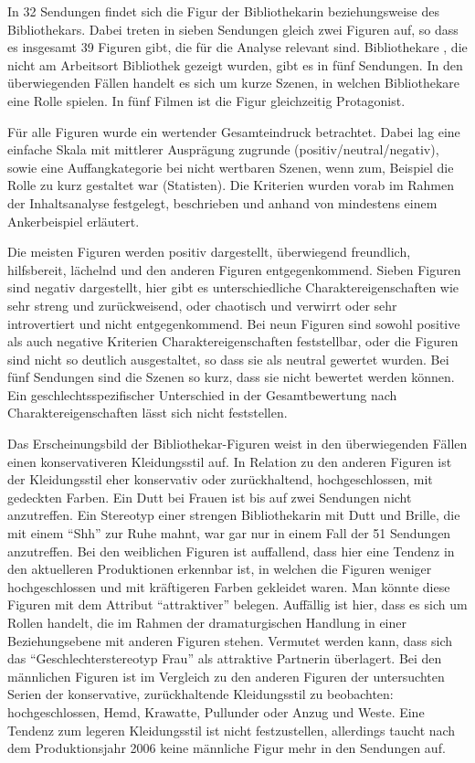 In 32 Sendungen findet sich die Figur der Bibliothekarin beziehungsweise
des Bibliothekars. Dabei treten in sieben Sendungen gleich zwei Figuren
auf, so dass es insgesamt 39 Figuren gibt, die für die Analyse relevant
sind. Bibliothekare , die nicht am Arbeitsort Bibliothek gezeigt wurden,
gibt es in fünf Sendungen. In den überwiegenden Fällen handelt es sich
um kurze Szenen, in welchen Bibliothekare eine Rolle spielen. In fünf
Filmen ist die Figur gleichzeitig Protagonist.

Für alle Figuren wurde ein wertender Gesamteindruck betrachtet. Dabei
lag eine einfache Skala mit mittlerer Ausprägung zugrunde
(positiv/neutral/negativ), sowie eine Auffangkategorie bei nicht
wertbaren Szenen, wenn zum, Beispiel die Rolle zu kurz gestaltet war
(Statisten). Die Kriterien wurden vorab im Rahmen der Inhaltsanalyse
festgelegt, beschrieben und anhand von mindestens einem Ankerbeispiel
erläutert.

Die meisten Figuren werden positiv dargestellt, überwiegend freundlich,
hilfsbereit, lächelnd und den anderen Figuren entgegenkommend. Sieben
Figuren sind negativ dargestellt, hier gibt es unterschiedliche
Charaktereigenschaften wie sehr streng und zurückweisend, oder chaotisch
und verwirrt oder sehr introvertiert und nicht entgegenkommend. Bei neun
Figuren sind sowohl positive als auch negative Kriterien
Charaktereigenschaften feststellbar, oder die Figuren sind nicht so
deutlich ausgestaltet, so dass sie als neutral gewertet wurden. Bei fünf
Sendungen sind die Szenen so kurz, dass sie nicht bewertet werden
können. Ein geschlechtsspezifischer Unterschied in der Gesamtbewertung
nach Charaktereigenschaften lässt sich nicht feststellen.

Das Erscheinungsbild der Bibliothekar-Figuren weist in den überwiegenden
Fällen einen konservativeren Kleidungsstil auf. In Relation zu den
anderen Figuren ist der Kleidungsstil eher konservativ oder
zurückhaltend, hochgeschlossen, mit gedeckten Farben. Ein Dutt bei
Frauen ist bis auf zwei Sendungen nicht anzutreffen. Ein Stereotyp einer
strengen Bibliothekarin mit Dutt und Brille, die mit einem \enquote{Shh}
zur Ruhe mahnt, war gar nur in einem Fall der 51 Sendungen anzutreffen.
Bei den weiblichen Figuren ist auffallend, dass hier eine Tendenz in den
aktuelleren Produktionen erkennbar ist, in welchen die Figuren weniger
hochgeschlossen und mit kräftigeren Farben gekleidet waren. Man könnte
diese Figuren mit dem Attribut \enquote{attraktiver} belegen. Auffällig
ist hier, dass es sich um Rollen handelt, die im Rahmen der
dramaturgischen Handlung in einer Beziehungsebene mit anderen Figuren
stehen. Vermutet werden kann, dass sich das
\enquote{Geschlechterstereotyp Frau} als attraktive Partnerin
überlagert. Bei den männlichen Figuren ist im Vergleich zu den anderen
Figuren der untersuchten Serien der konservative, zurückhaltende
Kleidungsstil zu beobachten: hochgeschlossen, Hemd, Krawatte, Pullunder
oder Anzug und Weste. Eine Tendenz zum legeren Kleidungsstil ist nicht
festzustellen, allerdings taucht nach dem Produktionsjahr 2006 keine
männliche Figur mehr in den Sendungen auf.


